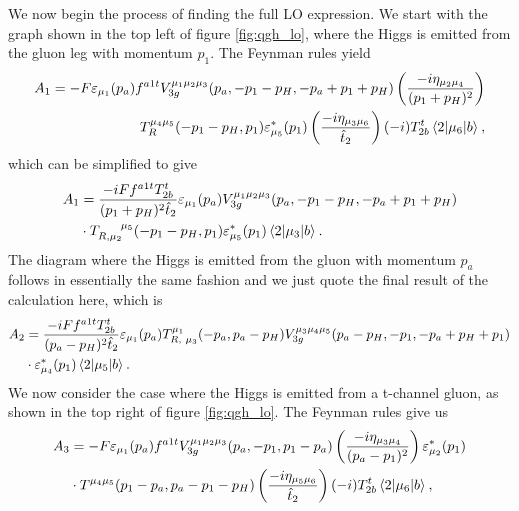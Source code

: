 We now begin the process of finding the full LO expression. We start with the graph shown in the top left of figure \ref{fig:qgh_lo}, where the Higgs is emitted from the gluon leg with momentum $p_1$. The Feynman rules yield
\begin{equation}
\begin{split}
A_1 = -F \varepsilon_{\mu_1}(p_a)f^{a1t}V_{3g}^{\mu_1 \mu_2 \mu_3}(p_a, -p_1-p_H,-p_a+p_1+p_H)\left(\frac{-i \eta_{\mu_2 \mu_4}}{(p_1+p_H)^2}\right) \\
T_R^{\mu_4 \mu_5}(-p_1-p_H, p_1) \varepsilon^*_{\mu_5}(p_1)\left(\frac{-i \eta_{\mu_3 \mu_6}}{\hat{t}_2}\right)(-i)T^t_{2b}\mathinner{\langle2\vert\mu_6\vert b\rangle}_{},
\end{split}
\end{equation}
which can be simplified to give
\begin{equation}
\begin{split}
A_1 &= \frac{-i Ff^{a1t}T^t_{2b}}{(p_1+p_H)^2 \hat{t}_2} \varepsilon_{\mu_1}(p_a)V_{3g}^{\mu_1 \mu_2 \mu_3}(p_a, -p_1-p_H,-p_a+p_1+p_H) \\
&\cdot T_{R, \mu_2}^{\hspace{15pt} \mu_5}(-p_1-p_H, p_1) \varepsilon^*_{\mu_5}(p_1)\mathinner{\langle2\vert\mu_3\vert b\rangle}_{}.
\end{split}
\end{equation}
The diagram where the Higgs is emitted from the gluon with momentum $p_a$ follows in essentially the same fashion and we just quote the final result of the calculation here, which is
\begin{equation}
\begin{split}
A_2 &=  \frac{-iFf^{a1t}T^t_{2b}}{(p_a-p_H)^2 \hat{t}_2} \varepsilon_{\mu_1}(p_a)T_{R, \hspace{3pt} \mu_3}^{\mu_1}(-p_a,p_a-p_H)V_{3g}^{\mu_3 \mu_4 \mu_5}(p_a-p_H,-p_1,-p_a+p_H+p_1) \\
& \cdot \varepsilon^*_{\mu_4}(p_1)\mathinner{\langle2\vert\mu_5\vert b\rangle}_{}.
\end{split}
\end{equation}
We now consider the case where the Higgs is emitted from a t-channel gluon, as shown in the top right of figure \ref{fig:qgh_lo}. The Feynman rules give us
\begin{equation}
\begin{split}
A_3 &= -F \varepsilon_{\mu_1}(p_a)f^{a1t}V_{3g}^{\mu_1 \mu_2 \mu_3}(p_a, -p_1, p_1 - p_a) \left(\frac{-i \eta_{\mu_3 \mu_4}}{(p_a-p_1)^2}\right) \varepsilon_{\mu_2}^*(p_1)\\
&\cdot T^{\mu_4 \mu_5}(p_1-p_a,p_a-p_1-p_H)\left(\frac{-i \eta_{\mu_5 \mu_6}}{\hat{t}_2} \right) (-i)T^t_{2b}\mathinner{\langle2\vert\mu_6\vert b\rangle}_{},
\end{split}
\end{equation}
